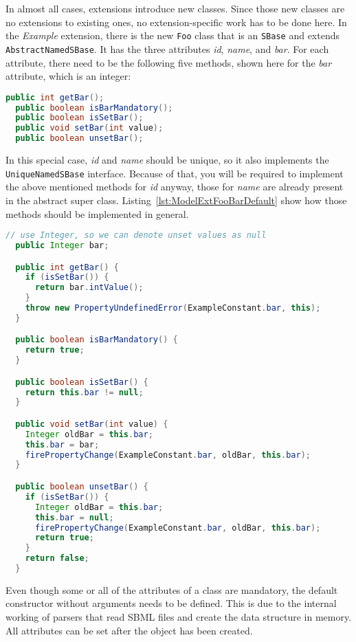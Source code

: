 In almost all cases, extensions introduce new classes.
Since those new classes are no extensions to existing ones, no extension-specific work has to be done here.
In the \emph{Example} extension, there is the new \texttt{Foo} class that is an \texttt{SBase} and extends \texttt{AbstractNamedSBase}.
It has the three attributes \emph{id}, \emph{name}, and \emph{bar}.
For each attribute, there need to be the following five methods, shown here for the \emph{bar} attribute, which is an integer:
\begin{lstlisting}[language=Java,float,caption={Convenience method to retrieve the extended model},label=lst:ModelExtFooBar]
  public int getBar();
  public boolean isBarMandatory();
  public boolean isSetBar();
  public void setBar(int value);
  public boolean unsetBar();
\end{lstlisting}

In this special case, \emph{id} and \emph{name} should be unique, so it also implements the \texttt{UniqueNamedSBase} interface.
Because of that, you will be required to implement the above mentioned methods for \emph{id} anyway, those for \emph{name} are already present in the abstract super class.
Listing~\vref{lst:ModelExtFooBarDefault} show how those methods should be implemented in general.

\begin{lstlisting}[language=Java,caption={Convenience method to retrieve the extended model},label=lst:ModelExtFooBarDefault]
  // use Integer, so we can denote unset values as null
  public Integer bar;

  public int getBar() {
    if (isSetBar()) {
      return bar.intValue();
    }
    throw new PropertyUndefinedError(ExampleConstant.bar, this);
  }

  public boolean isBarMandatory() {
    return true;
  }

  public boolean isSetBar() {
    return this.bar != null;
  }

  public void setBar(int value) {
    Integer oldBar = this.bar;
    this.bar = bar;
    firePropertyChange(ExampleConstant.bar, oldBar, this.bar);
  }

  public boolean unsetBar() {
    if (isSetBar()) {
      Integer oldBar = this.bar;
      this.bar = null;
      firePropertyChange(ExampleConstant.bar, oldBar, this.bar);
      return true;
    }
    return false;
  }
\end{lstlisting}

Even though some or all of the attributes of a class are mandatory, the default constructor without arguments needs to be defined.
This is due to the internal working of parsers that read SBML files and create the data structure in memory.
All attributes can be set after the object has been created.

